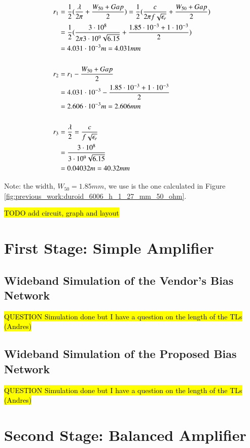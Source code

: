 \documentclass[12pt]{report} %
\newcommand{\question}[1]{\sethlcolor{red}\hl{QUESTION #1}}
\newcommand{\todo}[1]{\sethlcolor{green}\hl{TODO #1}}
\begin{document}
\begin{align*}
    r_1 &= \frac{1}{2} \* (\frac{\lambda}{2 \* \pi} + \frac{W_{50} + Gap}{2})  = \frac{1}{2} \* (\frac{c}{2 \* \pi \* f \* \sqrt{\epsilon_r}} + \frac{W_{50} + Gap}{2})  \\
    &= \frac{1}{2} \* (\frac{3 \cdot 10^8}{2 \* \pi \* 3 \cdot 10^9 \* \sqrt{6.15}} + \frac{1.85 \cdot 10^{-3} + 1 \cdot 10^{-3}}{2})  \\
    &= 4.031 \cdot 10^{-3} m = 4.031 mm \\
    \\
    r_2 &= r_1 - \frac{W_{50} + Gap}{2}  \\
    &= 4.031 \cdot 10^{-3} - \frac{1.85 \cdot 10^{-3} + 1 \cdot 10^{-3}}{2}  \\
    &= 2.606 \cdot 10^{-3} m = 2.606 mm \\
    \\
    r_3 &= \frac{\lambda}{2} = \frac{c}{f \* \sqrt{\epsilon_r}} \\
    &= \frac{3 \cdot 10^8}{3 \cdot 10^9 \* \sqrt{6.15}} \\
    &= 0.04032 m = 40.32 mm \\
\end{align*}

Note: the width, $W_{50} = 1.85 mm$, we use is the one calculated in Figure \ref{fig:previous_work:duroid_6006_h_1_27_mm_50_ohm}.

\todo{add circuit, graph and layout}

\section{First Stage: Simple Amplifier}


\subsection{Wideband Simulation of the Vendor's Bias Network}

\question{Simulation done but I have a question on the length of the TLs (Andres)}

\subsection{Wideband Simulation of the Proposed Bias Network}

\question{Simulation done but I have a question on the length of the TLs (Andres)}


\section{Second Stage: Balanced Amplifier}
\end{document}
